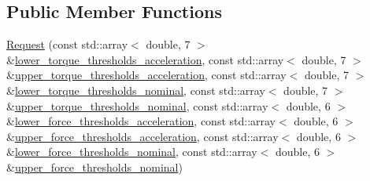 \subsection*{Public Member Functions}
\begin{DoxyCompactItemize}
\item 
\hyperlink{structresearch__interface_1_1robot_1_1SetCollisionBehavior_1_1Request_a45f725f94d814722be7e90f3605cef5c}{Request} (const std\+::array$<$ double, 7 $>$ \&\hyperlink{structresearch__interface_1_1robot_1_1SetCollisionBehavior_1_1Request_ae383766dd7327d5210f4af671c450fe0}{lower\+\_\+torque\+\_\+thresholds\+\_\+acceleration}, const std\+::array$<$ double, 7 $>$ \&\hyperlink{structresearch__interface_1_1robot_1_1SetCollisionBehavior_1_1Request_a2fbc8776e9e379b3c4a4ca385068234e}{upper\+\_\+torque\+\_\+thresholds\+\_\+acceleration}, const std\+::array$<$ double, 7 $>$ \&\hyperlink{structresearch__interface_1_1robot_1_1SetCollisionBehavior_1_1Request_acd3dd7a944935907cdc3ac5f98ca6a80}{lower\+\_\+torque\+\_\+thresholds\+\_\+nominal}, const std\+::array$<$ double, 7 $>$ \&\hyperlink{structresearch__interface_1_1robot_1_1SetCollisionBehavior_1_1Request_a4970067781b76b8ff8dfe452a4aaf1d2}{upper\+\_\+torque\+\_\+thresholds\+\_\+nominal}, const std\+::array$<$ double, 6 $>$ \&\hyperlink{structresearch__interface_1_1robot_1_1SetCollisionBehavior_1_1Request_a246f16d0a5efa11fdb3cd763f35c9410}{lower\+\_\+force\+\_\+thresholds\+\_\+acceleration}, const std\+::array$<$ double, 6 $>$ \&\hyperlink{structresearch__interface_1_1robot_1_1SetCollisionBehavior_1_1Request_ab42eca723dcdac40df722639b7bf4571}{upper\+\_\+force\+\_\+thresholds\+\_\+acceleration}, const std\+::array$<$ double, 6 $>$ \&\hyperlink{structresearch__interface_1_1robot_1_1SetCollisionBehavior_1_1Request_a43e31ce36f7042515ac6a6716618d98b}{lower\+\_\+force\+\_\+thresholds\+\_\+nominal}, const std\+::array$<$ double, 6 $>$ \&\hyperlink{structresearch__interface_1_1robot_1_1SetCollisionBehavior_1_1Request_ac19e6080eba637bc7d774ba0cccb3f93}{upper\+\_\+force\+\_\+thresholds\+\_\+nominal})
\end{DoxyCompactItemize}
